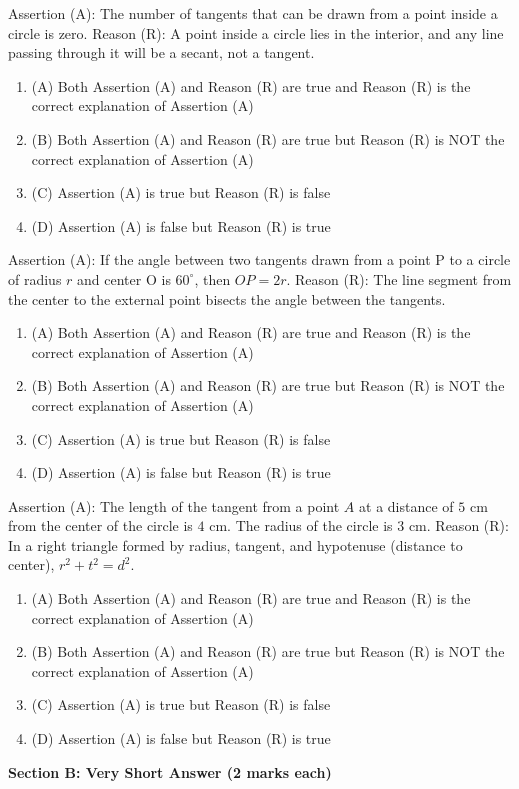 \documentclass[12pt,a4paper]{exam}
\begin{document}
\begin{questions}
\question[1] Assertion (A): The number of tangents that can be drawn from a point inside a circle is zero. Reason (R): A point inside a circle lies in the interior, and any line passing through it will be a secant, not a tangent.
\begin{enumerate}[label=(\Alph*)]
  \item (A) Both Assertion (A) and Reason (R) are true and Reason (R) is the correct explanation of Assertion (A)
  \item (B) Both Assertion (A) and Reason (R) are true but Reason (R) is NOT the correct explanation of Assertion (A)
  \item (C) Assertion (A) is true but Reason (R) is false
  \item (D) Assertion (A) is false but Reason (R) is true
\end{enumerate}
\vspace{0.15cm}

\question[1] Assertion (A): If the angle between two tangents drawn from a point P to a circle of radius $r$ and center O is $60^\circ$, then $OP = 2r$. Reason (R): The line segment from the center to the external point bisects the angle between the tangents.
\begin{enumerate}[label=(\Alph*)]
  \item (A) Both Assertion (A) and Reason (R) are true and Reason (R) is the correct explanation of Assertion (A)
  \item (B) Both Assertion (A) and Reason (R) are true but Reason (R) is NOT the correct explanation of Assertion (A)
  \item (C) Assertion (A) is true but Reason (R) is false
  \item (D) Assertion (A) is false but Reason (R) is true
\end{enumerate}
\vspace{0.15cm}

\question[1] Assertion (A): The length of the tangent from a point $A$ at a distance of $5 \text{ cm}$ from the center of the circle is $4 \text{ cm}$. The radius of the circle is $3 \text{ cm}$. Reason (R): In a right triangle formed by radius, tangent, and hypotenuse (distance to center), $r^2 + t^2 = d^2$.
\begin{enumerate}[label=(\Alph*)]
  \item (A) Both Assertion (A) and Reason (R) are true and Reason (R) is the correct explanation of Assertion (A)
  \item (B) Both Assertion (A) and Reason (R) are true but Reason (R) is NOT the correct explanation of Assertion (A)
  \item (C) Assertion (A) is true but Reason (R) is false
  \item (D) Assertion (A) is false but Reason (R) is true
\end{enumerate}
\vspace{0.15cm}

\end{questions}
\bigskip
\noindent\textbf{\large Section B: Very Short Answer (2 marks each)}
\end{document}
